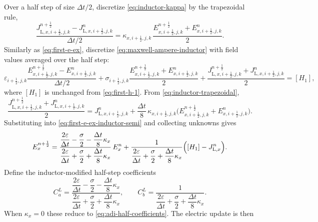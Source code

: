 \documentclass{article}
\numberwithin{equation}{section}
\numberwithin{figure}{section}
\begin{document}
Over a half step of size $\Delta t/2$, discretize \eqref{eq:inductor-kappa} by the trapezoidal rule,
\begin{equation}\label{eq:inductor-trapezoidal}
    \frac{J_{\mathrm{L},x,i+\tfrac12,j,k}^{n+\frac12}-J_{\mathrm{L},x,i+\tfrac12,j,k}^{n}}{\Delta t/2}
    = \kappa_{x,i+\tfrac12,j,k}\,\frac{E_{x,i+\tfrac12,j,k}^{n+\frac12}+E_{x,i+\tfrac12,j,k}^{n}}{2}.
\end{equation}
Similarly as \eqref{eq:first-e-ex}, discretize \eqref{eq:maxwell-ampere-inductor} with field values averaged over the half step:
\begin{equation}
    \varepsilon_{i+\tfrac12,j,k}\frac{E_{x,i+\tfrac12,j,k}^{n+\frac12}-E_{x,i+\tfrac12,j,k}^{n}}{\Delta t/2}
    + \sigma_{i+\tfrac12,j,k}\frac{E_{x,i+\tfrac12,j,k}^{n+\frac12}+E_{x,i+\tfrac12,j,k}^{n}}{2}
    + \frac{J_{\mathrm{L},x,i+\tfrac12,j,k}^{n+\frac12}+J_{\mathrm{L},x,i+\tfrac12,j,k}^{n}}{2}
        = [H_1],
    \label{eq:first-e-ex-inductor-semi}
\end{equation}
where $[H_1]$ is unchanged from \eqref{eq:first-h-1}. From \eqref{eq:inductor-trapezoidal},
\begin{equation}
    \frac{J_{\mathrm{L},x,i+\tfrac12,j,k}^{n+\frac12}+J_{\mathrm{L},x,i+\tfrac12,j,k}^{n}}{2}
    = J_{\mathrm{L},x,i+\tfrac12,j,k}^{n}
    + \frac{\Delta t}{8}\,\kappa_{x,i+\tfrac12,j,k}\bigl(E_{x,i+\tfrac12,j,k}^{n+\frac12}+E_{x,i+\tfrac12,j,k}^{n}\bigr).
\end{equation}
Substituting into \eqref{eq:first-e-ex-inductor-semi} and collecting unknowns gives
\begin{equation}
    E_{x}^{n+\frac12}
    = \frac{\dfrac{2\varepsilon}{\Delta t}-\dfrac{\sigma}{2}-\dfrac{\Delta t}{8}\kappa_x}
    {\dfrac{2\varepsilon}{\Delta t}+\dfrac{\sigma}{2}+\dfrac{\Delta t}{8}\kappa_x}\,E_{x}^{n}
    + \frac{1}{\dfrac{2\varepsilon}{\Delta t}+\dfrac{\sigma}{2}+\dfrac{\Delta t}{8}\kappa_x}
    \Bigl([H_1]-J_{\mathrm{L},x}^{n}\Bigr).
\end{equation}
Define the inductor-modified half-step coefficients
\begin{equation}\label{eq:adi-half-coefficients-inductor}
    C_a^{L}
    = \frac{\dfrac{2\varepsilon}{\Delta t}-\dfrac{\sigma}{2}-\dfrac{\Delta t}{8}\kappa_x}
    {\dfrac{2\varepsilon}{\Delta t}+\dfrac{\sigma}{2}+\dfrac{\Delta t}{8}\kappa_x},
    \qquad
    C_b^{L}
    = \frac{1}
    {\dfrac{2\varepsilon}{\Delta t}+\dfrac{\sigma}{2}+\dfrac{\Delta t}{8}\kappa_x}.
\end{equation}
When $\kappa_x=0$ these reduce to \eqref{eq:adi-half-coefficients}. The electric update is then
\end{document}
